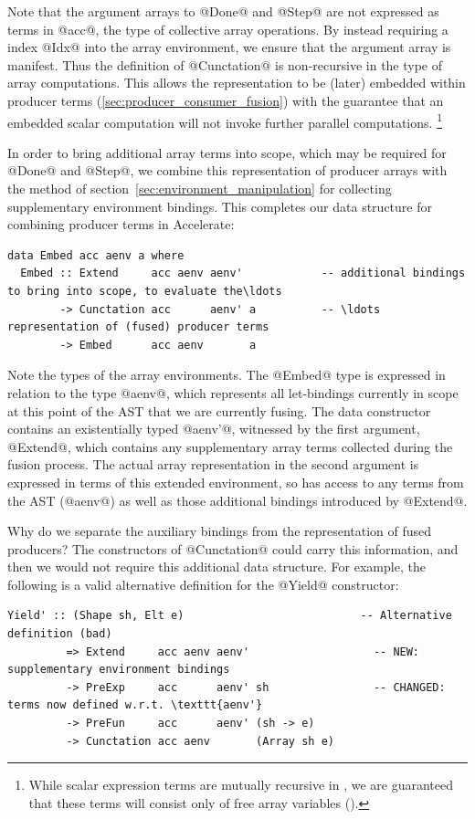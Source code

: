 Note that the argument arrays to @Done@ and @Step@ are not expressed
as terms in @acc@, the type of collective array operations. By instead
requiring a  index @Idx@ into the array environment, we
ensure that the argument array is manifest. Thus the definition of
@Cunctation@ is non-recursive in the type of array computations. This
allows the representation to be (later) embedded within producer terms
(\ref{sec:producer_consumer_fusion}) with the guarantee that an embedded scalar
computation will not invoke further parallel computations.%
\footnote{While scalar expression terms are mutually recursive in
, we are guaranteed that these terms will consist only of free
array variables ().}

In order to bring additional array terms into scope, which may be required for
@Done@ and @Step@, we combine this representation of producer
arrays with the method of section~\ref{sec:environment_manipulation} for
collecting supplementary environment bindings. This completes our data structure
for combining producer terms in Accelerate:
%
\begin{lstlisting}[style=haskell
    ,label=lst:Embed
    ,caption={Representation of fused producer arrays in Accelerate}]
data Embed acc aenv a where
  Embed :: Extend     acc aenv aenv'            -- additional bindings to bring into scope, to evaluate the\ldots
        -> Cunctation acc      aenv' a          -- \ldots representation of (fused) producer terms
        -> Embed      acc aenv       a
\end{lstlisting}

Note the types of the array environments. The @Embed@ type is expressed in
relation to the type @aenv@, which represents all let-bindings
currently in scope at this point of the AST that we
are currently fusing. The data constructor contains an existentially typed
@aenv'@, witnessed by the first argument, @Extend@, which contains any
supplementary array terms collected during the fusion process. The actual array
representation in the second argument is expressed in terms of this extended
environment, so has access to any terms from the AST (@aenv@) as well as
those additional bindings introduced by @Extend@.

Why do we separate the auxiliary bindings from the representation of fused
producers? The constructors of @Cunctation@ could carry this information,
and then we would not require this additional data structure. For example, the
following is a valid alternative definition for the @Yield@ constructor:
%
\begin{lstlisting}[style=haskell]
  Yield' :: (Shape sh, Elt e)                           -- Alternative definition (bad)
         => Extend     acc aenv aenv'                   -- NEW: supplementary environment bindings
         -> PreExp     acc      aenv' sh                -- CHANGED: terms now defined w.r.t. \texttt{aenv'}
         -> PreFun     acc      aenv' (sh -> e)
         -> Cunctation acc aenv       (Array sh e)
\end{lstlisting}

